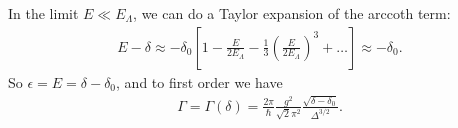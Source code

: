 \documentclass{article}
\theoremstyle{definition}
\newcommand{\f}[2]{\frac{#1}{#2}}
\newcommand{\lp}{\left(}
\newcommand{\rp}{\right)}
\newcommand{\lb}{\left[}
\newcommand{\rb}{\right]}
\begin{document}
\begin{enumerate}[label=(\alph*)]
In the limit $E \ll E_\Lambda$, we can do a Taylor expansion of the arccoth term:
\begin{align*}
E - \delta \approx -\delta_0 \lb 1 - \f{E}{2E_\Lambda} - \f{1}{3}\lp \f{E}{2E_\Lambda} \rp^3 + \dots \rb \approx -\delta_0.
\end{align*}
So $\epsilon = E = \delta - \delta_0$, and to first order we  have
\begin{align*}
\Gamma = \Gamma(\delta) = \f{2\pi }{\hbar}  \f{g^2}{\sqrt{2} \pi^2} \f{\sqrt{\delta - \delta_0}}{\Delta^{3/2}} .
\end{align*}






\end{enumerate}
\end{document}
